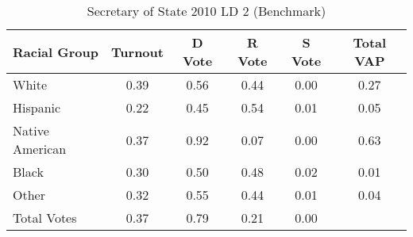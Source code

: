 \begin{table}[htb]
\begin{center}
\caption{Secretary of State 2010 LD 2 (Benchmark)}
\label{sos10_vap_ld_2_benchmark}
\begin{tabular}{lccccc}
  \hline
Racial Group & Turnout & D Vote & R Vote & S Vote & Total VAP \\ 
  \hline
White & 0.39 & 0.56 & 0.44 & 0.00 & 0.27 \\ 
  Hispanic & 0.22 & 0.45 & 0.54 & 0.01 & 0.05 \\ 
  Native American & 0.37 & 0.92 & 0.07 & 0.00 & 0.63 \\ 
  Black & 0.30 & 0.50 & 0.48 & 0.02 & 0.01 \\ 
  Other & 0.32 & 0.55 & 0.44 & 0.01 & 0.04 \\ 
  Total Votes & 0.37 & 0.79 & 0.21 & 0.00 &  \\ 
   \hline
\end{tabular}
\end{center}
\end{table}
